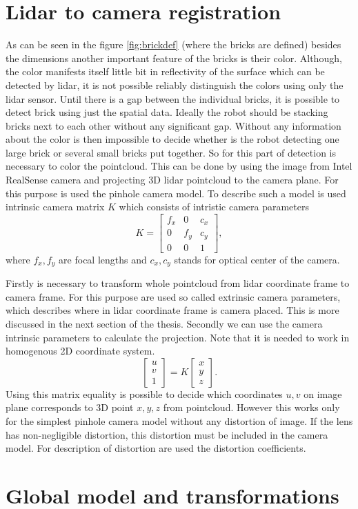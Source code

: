 \section{Lidar to camera registration}
As can be seen in the figure \ref{fig:brickdef} (where the bricks are defined) besides the dimensions another important feature of the bricks is their color. Although, the color manifests itself little bit in reflectivity of the surface which can be detected by lidar, it is not possible reliably distinguish the colors using only the lidar sensor. Until there is a gap between the individual bricks, it is possible to detect brick using just the spatial data. Ideally the robot should be stacking bricks next to each other without any significant gap. Without any information about the color is then impossible to decide whether is the robot detecting one large brick or several small bricks put together. So for this part of detection is necessary to color the pointcloud. This can be done by using the image from Intel RealSense camera and projecting 3D lidar pointcloud to the camera plane. For this purpose is used the pinhole camera model. To describe such a model is used intrinsic camera matrix $K$ which consists of intristic camera parameters \cite{hartley2017}
\begin{equation}
K = \begin{bmatrix}
f_x & 0 & c_x \\
0 & f_y & c_y \\
0 & 0 & 1
\end{bmatrix},
\end{equation}
where $f_x, f_y$ are focal lengths and $c_x, c_y$ stands for optical center of the camera.

Firstly is necessary to transform whole pointcloud from lidar coordinate frame to camera frame. For this purpose are used so called extrinsic camera parameters, which describes where in lidar coordinate frame is camera placed. This is more discussed in the next section of the thesis. Secondly we can use the camera intrinsic parameters to calculate the projection. Note that it is needed to work in homogenous 2D coordinate system.
\begin{equation}
\begin{bmatrix}
u\\
v\\
1
\end{bmatrix}
= K \begin{bmatrix}
x\\
y\\
z
\end{bmatrix}.
\end{equation}
Using this matrix equality is possible to decide which coordinates $u,v$ on image plane corresponds to 3D point $x,y,z$ from pointcloud. However this works only for the simplest pinhole camera model without any distortion of image. If the lens has non-negligible distortion, this distortion must be included in the camera model. For description of distortion are used the distortion coefficients.

\section{Global model and transformations}